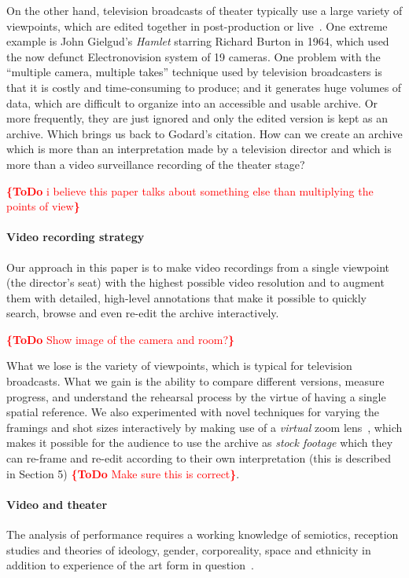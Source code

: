 \documentclass[conference]{IEEEtran}
\newcommand{\todo}[1]{\noindent\textcolor{red}{{\bf \{ToDo} #1{\bf \}}}}
\begin{document}
On the other hand, television broadcasts of theater typically use a large variety of viewpoints, which are edited together
in post-production or live~\cite{bouchez2007filmer}. One extreme example is John Gielgud's 
\emph{Hamlet} starring Richard Burton in 1964, which used  the now defunct Electronovision system of 19 cameras. 
One problem with the ``multiple camera, multiple takes'' technique used by television broadcasters 
is that it is costly and time-consuming to produce; and it generates huge volumes of data, which are 
difficult to organize into an accessible and usable archive. Or more frequently, they are just ignored
and only the edited version is kept as an archive. Which brings us back to Godard's citation. How can we create 
an archive which is  more than an interpretation made by a television director and which is more than a video surveillance recording of the theater stage? 

\todo{i believe this paper talks about something else than multiplying the points of view}
\paragraph*{Video recording strategy}
Our approach in this paper is to make video recordings from a single viewpoint (the director's seat) with the highest possible
video resolution and to augment them with detailed, high-level  annotations that make it possible to quickly  search, browse
and even re-edit the archive interactively. 


\todo{Show image of the camera and room?}

What we lose is the variety of viewpoints, which is typical for television broadcasts. What we gain is the ability to compare
different versions, measure progress, and understand the rehearsal process by the virtue of having a single spatial reference.
We also experimented with novel techniques for varying the framings and shot sizes interactively 
by making use of a {\em virtual}  zoom lens~\cite{Gandhi14}, which makes it possible for the audience to
use the archive as {\em stock footage} which they can re-frame and re-edit according to their own interpretation (this is described in Section 5) \todo{Make sure this is correct}. 


\paragraph*{Video and theater}

The analysis of performance requires a working knowledge of semiotics, reception studies and theories 
of ideology, gender, corporeality, space and ethnicity in addition to experience of the art form in question~\cite{Auslander97,Counsell01}.
\end{document}
